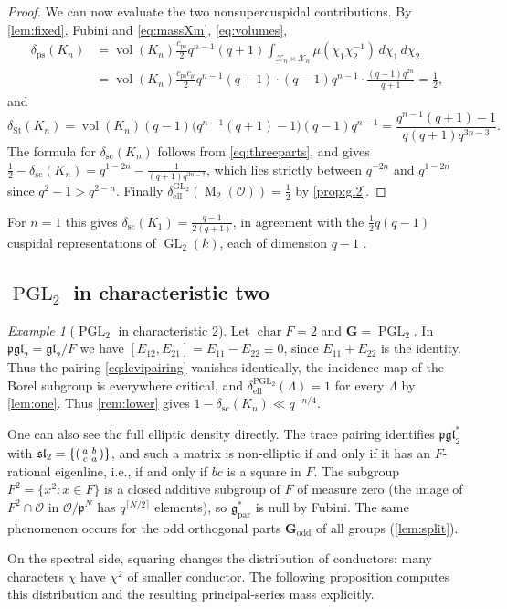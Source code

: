 \documentclass[11pt,reqno]{amsart}
\numberwithin{equation}{section}
\theoremstyle{plain}
\theoremstyle{definition}
\theoremstyle{remark}
\newtheorem{example}[theorem]{Example}
\theoremstyle{plain}
\newcommand{\OO}{\mathcal{O}}    %
\newcommand{\pp}{\mathfrak{p}}   %
\newcommand{\Lat}{\mathcal{L}}   %
\newcommand{\dLat}{\Lambda}      %
\newcommand{\bG}{\mathbf{G}}     %
\newcommand{\Godd}{\bG_{\mathrm{odd}}}
\newcommand{\g}{\mathfrak{g}}    %
\newcommand{\gd}{\mathfrak{g}^*} %
\newcommand{\Par}[2][]{#2_{#1\mathrm{par}}}
\newcommand{\scd}[1]{\delta_{\mathrm{sc}}(#1)}
\newcommand{\elld}[2][]{\delta_{\mathrm{ell}}^{#1}(#2)}  %
\newcommand{\Pps}{\delta_{\mathrm{ps}}(K_n)}       %
\newcommand{\Pst}{\delta_{\mathrm{St}}(K_n)}
\newcommand{\Cps}{c_{\mathrm{ps}}}
\newcommand{\Cmu}{c_\mu}
\newcommand{\Xc}{\mathcal{X}}                   %
\DeclareMathOperator{\vol}{vol}
\DeclareMathOperator{\GL}{GL}
\DeclareMathOperator{\PGL}{PGL}
\DeclareMathOperator{\Mat}{M}
\DeclareMathOperator{\chr}{char}   %
\newcommand{\oddorth}{odd orthogonal}
\begin{document}
\begin{proof}
We can now evaluate the two nonsupercuspidal contributions.
By \cref{lem:fixed}, Fubini and
\eqref{eq:massXm}, \eqref{eq:volumes},
\begin{align*}
\Pps&=\vol(K_n)\frac{\Cps}{2}q^{n-1}(q+1)\int_{\Xc_n\times\Xc_n}\mu(\chi_1\chi_2^{-1})\,d\chi_1\,d\chi_2\\
&=\vol(K_n)\frac{\Cps\Cmu}2q^{n-1}(q+1)\cdot(q-1)q^{n-1}\cdot\frac{(q-1)q^{2n}}{q+1}
=\frac12,
\end{align*}
and
\[
\Pst=\vol(K_n)(q-1)\bigl(q^{n-1}(q+1)-1\bigr)(q-1)q^{n-1}
=\frac{q^{n-1}(q+1)-1}{q(q+1)q^{3n-3}}.
\]
The formula for $\scd{K_n}$ follows from \eqref{eq:threeparts}, and gives
$\frac12-\scd{K_n}=q^{1-2n}-\frac1{(q+1)q^{3n-2}}$, which lies strictly
between $q^{-2n}$ and $q^{1-2n}$ since $q^2-1>q^{2-n}$. Finally
$\elld[\GL_2]{\Mat_2(\OO)}=\frac12$ by \cref{prop:gl2}.
\end{proof}

For $n=1$ this gives $\scd{K_1}=\frac{q-1}{2(q+1)}$, in agreement with the
$\frac12q(q-1)$ cuspidal representations of $\GL_2(k)$, each of dimension
$q-1$ \cite[6.4~Theorem, 11.5~Theorem and 14.3~Proposition]{MR2234120}.

\subsection{\texorpdfstring{$\PGL_2$}{PGL2} in characteristic two}

\begin{example}[$\PGL_2$ in characteristic $2$]\label{ex:pgl2}
Let $\chr F=2$ and $\bG=\PGL_2$. In $\mathfrak{pgl}_2=\mathfrak{gl}_2/F$
we have $[E_{12},E_{21}]=E_{11}-E_{22}\equiv0$, since
$E_{11}+E_{22}$ is the identity. Thus the pairing
\eqref{eq:levipairing} vanishes identically, the incidence map of the
Borel subgroup is everywhere critical, and $\elld[\PGL_2]{\dLat}=1$ for
every $\dLat$ by \cref{lem:one}. Thus \cref{rem:lower} gives
$1-\scd{K_n}\ll q^{-n/4}$.

One can also see the full elliptic density directly. The trace pairing identifies
$\mathfrak{pgl}_2^*$ with $\mathfrak{sl}_2=\{\begin{psmallmatrix}a&b\\c&a\end{psmallmatrix}\}$,
and such a matrix is non-elliptic if and only if it has an $F$-rational
eigenline, i.e., if and only if $bc$ is a square in $F$. The subgroup
$F^2=\{x^2:x\in F\}$ is a closed additive subgroup of $F$ of measure zero (the image of $F^2\cap\OO$ in $\OO/\pp^N$ has
$q^{\lceil N/2\rceil}$ elements), so $\Par{\gd}$ is null by Fubini. The same
phenomenon occurs for the \oddorth{} parts $\Godd$ of all groups (\cref{lem:split}).

On the spectral side, squaring changes the distribution of conductors:
many characters $\chi$ have $\chi^2$ of smaller conductor. The
following proposition computes this distribution and the resulting
principal-series mass explicitly.
\end{example}
\end{document}

